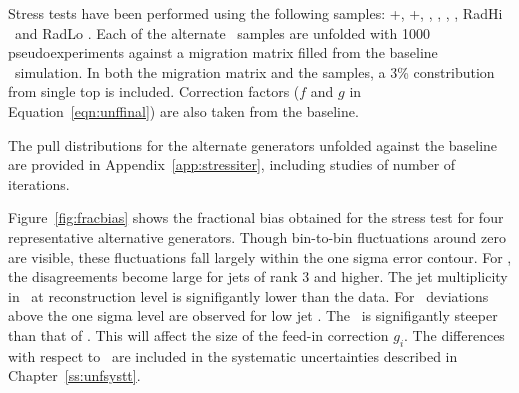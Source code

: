 Stress tests have been performed using the following samples: \pow+\py, \pow+\hw, \madpy, \mcnlohw, \peight, \hdamp, RadHi \madpy\ and RadLo \madpy. Each of the alternate \ttbar\ samples are unfolded with 1000 pseudoexperiments against a migration matrix filled from the baseline \ttbar\ simulation. In both the migration matrix and the samples, a 3\% constribution from single top is included. Correction factors ($f$ and $g$ in Equation~\ref{eqn:unffinal}) are also taken from the baseline.

The pull distributions for the alternate generators unfolded against the baseline are provided in Appendix~\ref{app:stressiter}, including studies of number of iterations.

Figure~\ref{fig:fracbias} shows the fractional bias obtained for the stress test for four representative alternative generators. Though bin-to-bin fluctuations around zero are visible, these fluctuations fall largely within the one sigma error contour. For \mcnlohw, the disagreements become large for jets of rank 3 and higher. The jet multiplicity in \mcnlohw\ at reconstruction level is signifigantly lower than the data. For \madpy\ deviations above the one sigma level are observed for low jet \pt. The \madpy\ is signifigantly steeper than that of \powpy. This will affect the size of the feed-in correction $g_i$. The differences with respect to \madpy\ are included in the systematic uncertainties described in Chapter~\ref{ss:unfsystt}.

